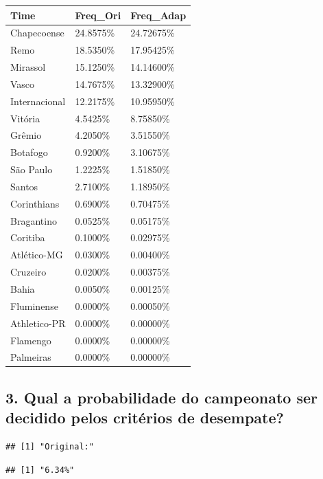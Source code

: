\documentclass[11pt,]{article}
\begin{document}
\begin{longtable}[]{@{}lll@{}}
\toprule\noalign{}
Time & Freq\_Ori & Freq\_Adap \\
\midrule\noalign{}
\endhead
\bottomrule\noalign{}
\endlastfoot
Chapecoense & 24.8575\% & 24.72675\% \\
Remo & 18.5350\% & 17.95425\% \\
Mirassol & 15.1250\% & 14.14600\% \\
Vasco & 14.7675\% & 13.32900\% \\
Internacional & 12.2175\% & 10.95950\% \\
Vitória & 4.5425\% & 8.75850\% \\
Grêmio & 4.2050\% & 3.51550\% \\
Botafogo & 0.9200\% & 3.10675\% \\
São Paulo & 1.2225\% & 1.51850\% \\
Santos & 2.7100\% & 1.18950\% \\
Corinthians & 0.6900\% & 0.70475\% \\
Bragantino & 0.0525\% & 0.05175\% \\
Coritiba & 0.1000\% & 0.02975\% \\
Atlético-MG & 0.0300\% & 0.00400\% \\
Cruzeiro & 0.0200\% & 0.00375\% \\
Bahia & 0.0050\% & 0.00125\% \\
Fluminense & 0.0000\% & 0.00050\% \\
Athletico-PR & 0.0000\% & 0.00000\% \\
Flamengo & 0.0000\% & 0.00000\% \\
Palmeiras & 0.0000\% & 0.00000\% \\
\end{longtable}

\newpage

\hypertarget{qual-a-probabilidade-do-campeonato-ser-decidido-pelos-crituxe9rios-de-desempate-1}{%
\subsection{3. Qual a probabilidade do campeonato ser decidido pelos
critérios de
desempate?}\label{qual-a-probabilidade-do-campeonato-ser-decidido-pelos-crituxe9rios-de-desempate-1}}

\begin{verbatim}
## [1] "Original:"
\end{verbatim}

\begin{verbatim}
## [1] "6.34%"
\end{verbatim}
\end{document}
